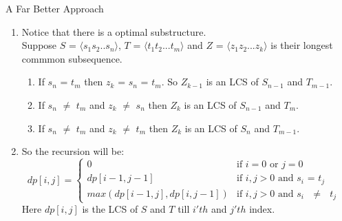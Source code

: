 \documentclass{beamer}
\begin{document}
\begin{frame}{A Far Better Approach}
\begin{enumerate}
    \onslide\item<1-> Notice that there is a optimal substructure. \\
    Suppose $S$ = $\langle$$s_1$$s_2$..$s_n$$\rangle$, $T$ = $\langle$$t_1$$t_2$...$t_m$$\rangle$ and $Z$ = $\langle$$z_1$$z_2$...$z_k$$\rangle$ is their longest commmon subsequence.
    \begin{enumerate}
        \onslide\item<1-> If $s_n$ = $t_m$ then $z_k$ = $s_n$ = $t_m$. So $Z_{k-1}$ is an LCS of $S_{n-1}$ and $T_{m-1}$.
        \onslide\item<2-> If $s_n$ $\neq$ $t_m$ and $z_k$ $\neq$ $s_n$ then $Z_k$ is an LCS of $S_{n-1}$ and $T_m$.
        \onslide\item<3-> If $s_n$ $\neq$ $t_m$ and $z_k$ $\neq$ $t_m$ then $Z_k$ is an LCS of $S_{n}$ and $T_{m-1}$.
    \end{enumerate}
    \onslide\item<4-> So the recursion will be: \\
    \[ dp[i,j] =  \begin{cases} 
      0 &  \text{if $i=0$ or $j=0$}   \\
      dp[i-1, j-1] & \text{if $i,j > 0$ and $s_i$ = $t_j$ } \\
      max(dp[i-1, j], dp[i, j-1]) & \text{if $i,j > 0$ and $s_i$  $\neq$ $t_j$ } 
   \end{cases} \]
   Here $dp[i,j]$ is the LCS of $S$ and $T$ till $i'th$ and $j'th$ index.
   
\end{enumerate}
\end{frame}
\end{document}
